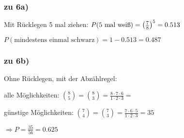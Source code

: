 \subsubsection{zu 6a)}
Mit Rücklegen 5 mal ziehen: $ P(\textrm{5 mal weiß}) =  \left( \frac{7}{8} \right) ^5 = 0.513 $

$ P(\textrm{mindestens einmal schwarz}) = 1 - 0.513 = 0.487 $

\subsubsection{zu 6b)}
Ohne Rücklegen, mit der Abzählregel: 

alle Möglichkeiten: $ \binom 8 5 = \binom 8 3 = \frac{8\cdot 7\cdot 6}{1\cdot 2\cdot 3} = $

günstige Möglichkeiten: $ \binom 7 4 = \binom 7 3 = \frac{7\cdot 6\cdot 5}{1\cdot 2\cdot 3} = 35 $ 

$\Rightarrow P = \frac{35}{56} = 0.625 $

